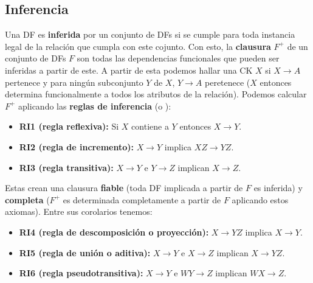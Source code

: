 \subsection*{Inferencia}
Una DF es \textbf{inferida} por un conjunto de DFs si se cumple para toda instancia legal de la relación que cumpla con este cojunto. Con esto, la \textbf{clausura} $F^+$ de un conjunto de DFs $F$ son todas las dependencias funcionales que pueden ser inferidas a partir de este. A partir de esta podemos hallar una CK $X$ si $X \rightarrow A$ pertenece y para ningún subconjunto $Y$ de $X$, $Y \rightarrow A$ peretenece ($X$ entonces determina funcionalmente a todos los atributos de la relación).
Podemos calcular $F^+$ aplicando las \textbf{reglas de inferencia} (o ):
\begin{itemize}
    \item \textbf{RI1 (regla reflexiva):} Si $X$ contiene a $Y$ entonces $X \rightarrow Y$.
    \item \textbf{RI2 (regla de incremento):} $X \rightarrow Y$ implica $XZ \rightarrow YZ$.
    \item \textbf{RI3 (regla transitiva):} $X \rightarrow Y$ e $Y \rightarrow Z$ implican $X \rightarrow Z$.
\end{itemize}
Estas crean una clausura \textbf{fiable} (toda DF implicada a partir de $F$ es inferida) y \textbf{completa} ($F^+$ es determinada completamente a partir de $F$ aplicando estos axiomas). Entre sus corolarios tenemos:
\begin{itemize}
    \item \textbf{RI4 (regla de descomposición o proyección):} $X \rightarrow YZ$ implica $X \rightarrow Y$.
    \item \textbf{RI5 (regla de unión o aditiva):} $X \rightarrow Y$ e $X \rightarrow Z$ implican $X \rightarrow YZ$.
    \item \textbf{RI6 (regla pseudotransitiva):} $X \rightarrow Y$ e $WY \rightarrow Z$ implican $WX \rightarrow Z$.
\end{itemize}